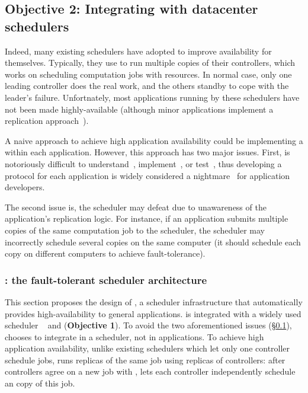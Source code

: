 \vspace{-.15in}\subsection{Objective 2: Integrating \falcon with datacenter 
schedulers}\label{sec:scheduler}\vspace{-.075in}

Indeed, many existing schedulers have adopted \paxos to improve availability 
for themselves. Typically, they use \paxos to run multiple copies of their 
controllers, which works on scheduling computation jobs with resources. In 
normal case, only one leading controller does the real work, and the others 
standby to cope with the leader's failure. Unfortnately, most applications 
running by these schedulers have not been made highly-available (although minor 
applications implement a replication 
approach~\cite{mapreduce:osdi04,dolly:nsdi12}).

A naive approach to achieve high application availability could be implementing 
a \paxos within each application. However, this approach has two major issues. 
First, \paxos is notoriously difficult to 
understand~\cite{raft:usenix14,paxos:simple}, implement~\cite{paxos:practical, 
paxos:live}, or test~\cite{modist:nsdi11,demeter:sosp11}, thus developing a 
\paxos protocol for each application is widely considered a 
nightmare~\cite{modist:nsdi11,demeter:sosp11,paxos:live} for application 
developers.

The second issue is, the scheduler may defeat \paxos due to unawareness of the 
application's \paxos replication logic. For instance, if an application submits 
multiple copies of the same computation job to the scheduler, the scheduler may 
incorrectly schedule several copies on the same computer (it should schedule 
each copy on different computers to achieve \paxos fault-tolerance).

\vspace{-.15in}\subsubsection{\tripod: the fault-tolerant scheduler 
architecture} 
\label{sec:scheduler-arch}\vspace{-.075in}

This section proposes the design of \tripod, a scheduler infrastructure that 
automatically provides high-availability to general applications. \tripod 
is integrated with a widely used scheduler \mesos~\cite{mesos:nsdi11} and 
\falcon (\textbf{Objective 1}). To avoid the two aforementioned issues 
(\S\ref{sec:scheduler}), \tripod chooses 
to integrate \paxos in a scheduler, not in applications. To achieve high
application availability, unlike existing schedulers which let only one 
controller schedule jobs, \tripod runs replicas of the same job using replicas 
of controllers: after controllers agree on a new job with \falcon, \tripod lets 
each controller independently schedule an copy of this job.

